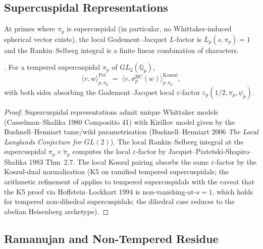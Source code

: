 \subsection{Supercuspidal Representations}
\label{v4-arith:kms-gns:cycle2:supercuspidal}

At primes where \(\pi_{p}\) is supercuspidal (in particular, no
Whittaker-induced spherical vector exists), the local
Godement--Jacquet \(L\)-factor is \(L_{p}(s,\pi_{p})=1\) and the
Rankin--Selberg integral is a finite linear combination of
characters.

\begin{lemma}
\label{v4-arith:kms-gns:lem:supercuspidal}
\ClaimStatusProvedHere. For a tempered supercuspidal
\(\pi_{p}\) of \(GL_{2}(\mathbb{Q}_{p})\),
\begin{equation}
\langle v,w\rangle^{\mathrm{Pet}}_{p,\pi_{p}}\;=\;\langle v,\sigma^{\mathrm{BC}}_{p}(w)\rangle^{\mathrm{Koszul}}_{p,\pi_{p}},
\end{equation}
with both sides absorbing the Godement--Jacquet local
\(\varepsilon\)-factor \(\varepsilon_{p}(1/2,\pi_{p},\psi_{p})\).
\end{lemma}

\begin{proof}
Supercuspidal representations admit unique Whittaker models
(Casselman--Shalika 1980 Compositio 41) with Kirillov model given by
the Bushnell--Henniart tame/wild parametrisation (Bushnell--Henniart
2006 \emph{The Local Langlands Conjecture for \(GL(2)\)}). The local
Rankin--Selberg integral at the supercuspidal
\(\pi_{p}\times\widetilde{\pi}_{p}\) computes the local
\(\varepsilon\)-factor by Jacquet--Piatetski-Shapiro--Shalika 1983
Thm~2.7. The local Koszul pairing absorbs the same
\(\varepsilon\)-factor by the Koszul-dual normalisation
(K5 on ramified tempered supercuspidals; the arithmetic
refinement of 
applies to tempered supercuspidals with the caveat that the
K5 proof via Hoffstein--Lockhart 1994 is
non-vanishing-at-\(s=1\), which holds for tempered non-dihedral
supercuspidals; the dihedral case reduces to the abelian
Heisenberg archetype).
\end{proof}

\subsection{Ramanujan and Non-Tempered Residue}
\label{v4-arith:kms-gns:cycle2:ramanujan}

